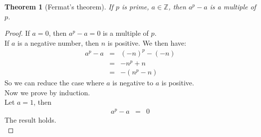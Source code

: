 \documentclass{article}
\theoremstyle{MyNonumberplain}
\theoremstyle{break}
\newtheorem*{proof}{Proof. }
\theoremstyle{break}
\newtheorem{theorem}{Theorem}[section]
\theoremstyle{break}
\theoremstyle{definition}
\theoremstyle{break}
\begin{document}
\begin{thmbox}
    \begin{theorem}[Fermat's theorem]
        If $p$ is prime, $a \in \mathbb{Z}$, then $a^p - a$ is a multiple of $p$.
    \end{theorem}
    \begin{prfbox}
        \begin{proof}
            If $a = 0$, then $a^p - a = 0$ is a multiple of $p$.\\

            If $a$ is a negative number, then $n$ is positive. We then have:
            \begin{eqnarray*}
              a^p - a & = & (- n)^p - (- n)\\
              & = & - n^p + n\\
              & = & - (n^p - n)
            \end{eqnarray*}
            So we can reduce the case where $a$ is negative to $a$ is positive.\\
            
            Now we prove by induction.\\
            
            Let $a = 1$, then
            \begin{eqnarray*}
              a^p - a & = & 0
            \end{eqnarray*}
            The result holds.\\
            

\end{proof}
\end{prfbox}
\end{thmbox}
\end{document}
